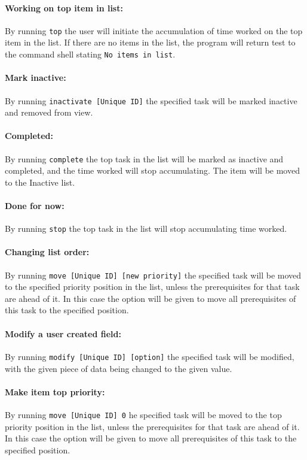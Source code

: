 \documentclass[12pt]{article}
\newcommand{\e}[1] {{\tt #1}}
\begin{document}
\paragraph{Working on top item in list:} \label{sec:Working on top} By running \e{top} the user will initiate the accumulation of time worked on the top item in the list. If there are no items in the list, the program will return test to the command shell stating \e{No items in list}.
\paragraph{Mark inactive:} \label{sec:Mark inactive} By running \e{inactivate [Unique ID]} the specified task will be marked inactive and removed from view.
\paragraph{Completed:} \label{sec:Completed} By running \e{complete} the top task in the list will be marked as inactive and completed, and the time worked will stop accumulating. The item will be moved to the Inactive list.
\paragraph{Done for now:} \label{sec:Done for now} By running \e{stop} the top task in the list will stop accumulating time worked.
\paragraph{Changing list order:} \label{sec:Change order} By running \e{move [Unique ID] [new priority]} the specified task will be moved to the specified priority position in the list, unless the prerequisites for that task are ahead of it. In this case the option will be given to move all prerequisites of this task to the specified position.
\paragraph{Modify a user created field:} \label{sec:Modify} By running \e{modify [Unique ID] [option]} the specified task will be modified, with the given piece of data being changed to the given value.
\paragraph{Make item top priority:} \label{sec:Make top} By running \e{move [Unique ID] 0} he specified task will be moved to the top priority position in the list, unless the prerequisites for that task are ahead of it. In this case the option will be given to move all prerequisites of this task to the specified position.
\end{document}
